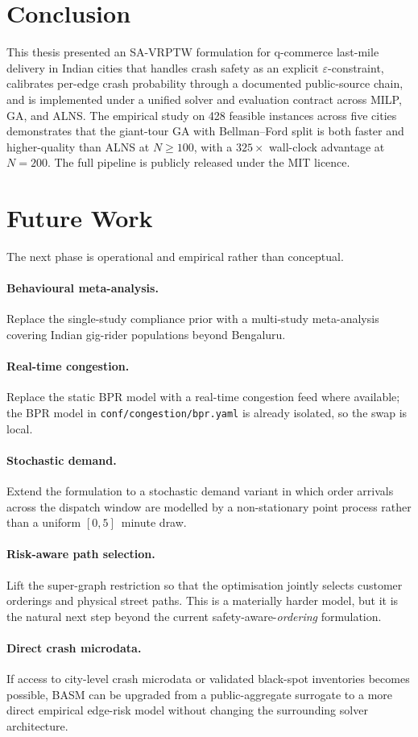 \section{Conclusion}

This thesis presented an SA-VRPTW formulation for q-commerce
last-mile delivery in Indian cities that handles crash safety as an
explicit $\varepsilon$-constraint, calibrates per-edge crash
probability through a documented public-source chain, and is
implemented under a unified solver and evaluation contract across
MILP, GA, and ALNS. The empirical study on 428 feasible instances
across five cities demonstrates that the giant-tour GA with
Bellman--Ford split is both faster and higher-quality than ALNS at
$N \geq 100$, with a $325\times$ wall-clock advantage at $N = 200$.
The full pipeline is publicly released under the MIT licence.

\section{Future Work}

The next phase is operational and empirical rather than conceptual.

\paragraph{Behavioural meta-analysis.}
Replace the single-study \citet{das2020} compliance prior with a
multi-study meta-analysis covering Indian gig-rider populations
beyond Bengaluru.

\paragraph{Real-time congestion.}
Replace the static BPR model with a real-time congestion feed where
available; the BPR model in \texttt{conf/congestion/bpr.yaml} is
already isolated, so the swap is local.

\paragraph{Stochastic demand.}
Extend the formulation to a stochastic demand variant in which order
arrivals across the dispatch window are modelled by a non-stationary
point process rather than a uniform $[0, 5]$~minute draw.

\paragraph{Risk-aware path selection.}
Lift the super-graph restriction so that the optimisation jointly
selects customer orderings and physical street paths. This is a
materially harder model, but it is the natural next step beyond the
current safety-aware-\emph{ordering} formulation.

\paragraph{Direct crash microdata.}
If access to city-level crash microdata or validated black-spot
inventories becomes possible, BASM can be upgraded from a
public-aggregate surrogate to a more direct empirical edge-risk
model without changing the surrounding solver architecture.
